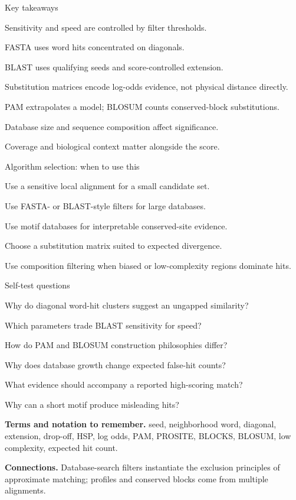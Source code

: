 \documentclass[11pt,letterpaper]{article}
\begin{document}
\begin{CornellSummaryBox}{Key takeaways}
\begin{CornellRecallList}
  \item Sensitivity and speed are controlled by filter thresholds.
  \item FASTA uses word hits concentrated on diagonals.
  \item BLAST uses qualifying seeds and score-controlled extension.
  \item Substitution matrices encode log-odds evidence, not physical distance directly.
  \item PAM extrapolates a model; BLOSUM counts conserved-block substitutions.
  \item Database size and sequence composition affect significance.
  \item Coverage and biological context matter alongside the score.
\end{CornellRecallList}
\end{CornellSummaryBox}

\begin{CornellOverviewBox}{Algorithm selection: when to use this}
\begin{CornellChecklist}
  \item Use a sensitive local alignment for a small candidate set.
  \item Use FASTA- or BLAST-style filters for large databases.
  \item Use motif databases for interpretable conserved-site evidence.
  \item Choose a substitution matrix suited to expected divergence.
  \item Use composition filtering when biased or low-complexity regions dominate hits.
\end{CornellChecklist}
\end{CornellOverviewBox}

\begin{CornellExamBox}{Self-test questions}
\begin{CornellRecallList}
  \item Why do diagonal word-hit clusters suggest an ungapped similarity?
  \item Which parameters trade BLAST sensitivity for speed?
  \item How do PAM and BLOSUM construction philosophies differ?
  \item Why does database growth change expected false-hit counts?
  \item What evidence should accompany a reported high-scoring match?
  \item Why can a short motif produce misleading hits?
\end{CornellRecallList}
\end{CornellExamBox}

{\footnotesize
\textbf{Terms and notation to remember.} seed, neighborhood word, diagonal, extension, drop-off, HSP, log odds, PAM, PROSITE, BLOCKS, BLOSUM, low complexity, expected hit count.

\textbf{Connections.} Database-search filters instantiate the exclusion principles of approximate matching; profiles and conserved blocks come from multiple alignments.
}
\end{document}
